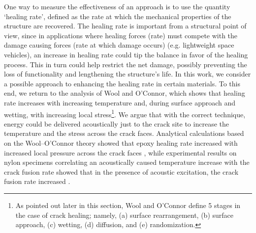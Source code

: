 \documentclass[11pt,letterpaper]{article}%
\begin{document}
One way to measure the effectiveness of an approach is to use the
quantity `healing rate', defined as the rate at which the
mechanical properties of the structure are recovered. The healing
rate is important from a structural point of view, since in
applications where healing forces (rate) must compete with the
damage causing forces (rate at which damage occurs) (e.g.
lightweight space vehicles), an increase in healing rate could tip
the balance in favor of the healing process.  This in turn could
help restrict the net damage,  possibly preventing the loss of
functionality and lengthening the structure's life.  In this work,
we consider a possible approach to enhancing the healing rate in
certain materials.  To this end, we return to the analysis of Wool
and O'Connor, which shows that healing rate increases with
increasing temperature and, during surface approach and wetting,
with increasing local stress\footnote{As pointed out later in this
section, Wool and O'Connor define 5 stages in the case of crack
healing; namely, (a) surface rearrangement, (b) surface approach,
(c) wetting, (d) diffusion, and (e) randomization.}. We argue that
with the correct technique, energy could be delivered acoustically
just to the crack site to increase the temperature and the stress
across the crack faces. Analytical calculations based on the
Wool--O'Connor theory \cite{wool} showed that epoxy healing rate
increased with increased local pressure across the crack faces
\cite{barnes}, while experimental results on nylon specimens
correlating an acoustically caused temperature increase with the
crack fusion rate showed that in the presence of acoustic
excitation, the crack fusion rate increased \cite{sarrazin}.
\end{document}
